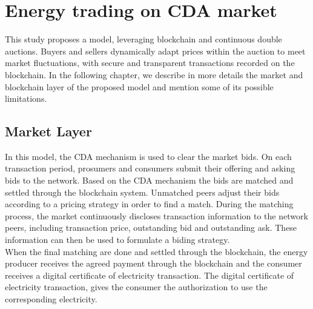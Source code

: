 \section{Energy trading on CDA market}
\label{sec:cda}
This study proposes a model, leveraging blockchain and continuous double auctions. Buyers and sellers dynamically adapt prices within the auction to meet market fluctuations, with secure and 
transparent transactions recorded on the blockchain. In the following chapter, we describe in more details the market and blockchain layer of the proposed model and mention some of its possible 
limitations.

\subsection{Market Layer}
In this model, the CDA mechanism is used to clear the market bids. On each transaction period, prosumers and consumers submit their offering and asking bids to the network.
Based on the CDA mechanism the bids are matched and settled through the blockchain system. Unmatched peers adjust their bids according to a pricing strategy in order to find
a match. During the matching process, the market continuously discloses transaction information to the network peers, including transaction price, outstanding
bid and outstanding ask. These information can then be used to formulate a biding strategy.\\
When the final matching are done and settled through the blockchain, the energy producer receives the agreed payment through the blockchain and the consumer receives a digital
certificate of electricity transaction. The digital certificate of electricity transaction, gives the consumer the authorization to use the corresponding electricity.
\cite{wang2017novel}

